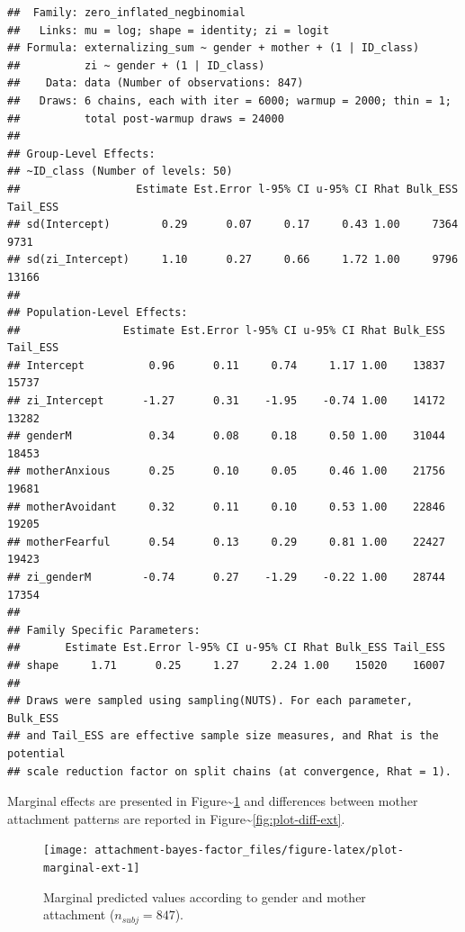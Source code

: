 \documentclass[
]{book}
\begin{document}
\begin{verbatim}
##  Family: zero_inflated_negbinomial 
##   Links: mu = log; shape = identity; zi = logit 
## Formula: externalizing_sum ~ gender + mother + (1 | ID_class) 
##          zi ~ gender + (1 | ID_class)
##    Data: data (Number of observations: 847) 
##   Draws: 6 chains, each with iter = 6000; warmup = 2000; thin = 1;
##          total post-warmup draws = 24000
## 
## Group-Level Effects: 
## ~ID_class (Number of levels: 50) 
##                  Estimate Est.Error l-95% CI u-95% CI Rhat Bulk_ESS Tail_ESS
## sd(Intercept)        0.29      0.07     0.17     0.43 1.00     7364     9731
## sd(zi_Intercept)     1.10      0.27     0.66     1.72 1.00     9796    13166
## 
## Population-Level Effects: 
##                Estimate Est.Error l-95% CI u-95% CI Rhat Bulk_ESS Tail_ESS
## Intercept          0.96      0.11     0.74     1.17 1.00    13837    15737
## zi_Intercept      -1.27      0.31    -1.95    -0.74 1.00    14172    13282
## genderM            0.34      0.08     0.18     0.50 1.00    31044    18453
## motherAnxious      0.25      0.10     0.05     0.46 1.00    21756    19681
## motherAvoidant     0.32      0.11     0.10     0.53 1.00    22846    19205
## motherFearful      0.54      0.13     0.29     0.81 1.00    22427    19423
## zi_genderM        -0.74      0.27    -1.29    -0.22 1.00    28744    17354
## 
## Family Specific Parameters: 
##       Estimate Est.Error l-95% CI u-95% CI Rhat Bulk_ESS Tail_ESS
## shape     1.71      0.25     1.27     2.24 1.00    15020    16007
## 
## Draws were sampled using sampling(NUTS). For each parameter, Bulk_ESS
## and Tail_ESS are effective sample size measures, and Rhat is the potential
## scale reduction factor on split chains (at convergence, Rhat = 1).
\end{verbatim}

Marginal effects are presented in Figure\textasciitilde\ref{fig:plot-marginal-ext} and differences between mother attachment patterns are reported in Figure\textasciitilde\ref{fig:plot-diff-ext}.

\begin{figure}

{\centering \texttt{[image: attachment-bayes-factor\_files/figure-latex/plot-marginal-ext-1]} 

}

\caption{Marginal predicted values according to gender and mother attachment ($n_{subj} = 847$).}\label{fig:plot-marginal-ext}
\end{figure}
\end{document}
